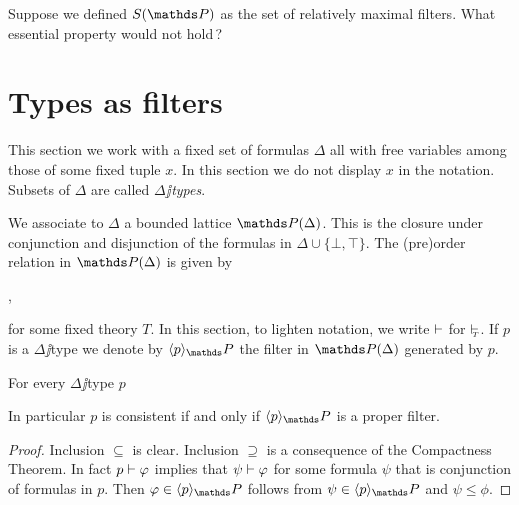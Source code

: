 \documentclass[creche.tex]{subfiles}
\begin{document}
\begin{exercise}
Suppose we defined $S(\PP)$ as the set of relatively maximal filters. What essential property would not hold\,?\QED 
\end{exercise}
\section{Types as filters}\label{frammenti}

This section we work with a fixed set of formulas \emph{$\Delta$\/} all with free variables among those of some fixed tuple \emph{$x$}. In this section we do not display $x$ in the notation. Subsets of $\Delta$ are called \emph{$\Delta\jj$types}.

We associate to $\Delta$ a bounded lattice \emph{$\PP(\Delta)$}. This is the closure under conjunction and disjunction of the formulas in $\Delta\cup\{\bot,\top\}$. The (pre)order relation in $\PP(\Delta)$ is given by

\ceq{\hfill \psi\le\phi}{\dIFF}{\psi\ \provesT\ \phi}, 

for some fixed theory $T$. In this section, to lighten notation, we write $\vdash$ for $\provesT$. If $p$ is a $\Delta\jj$type we denote by $\<p\>_\PP$ the filter in $\PP(\Delta)$ generated by $p$.




\begin{lemma}\label{lem_poiuyhdsdfd}
For every $\Delta\jj$type $p$


In particular $p$ is consistent if and only if $\<p\>_\PP$ is a proper filter.
\end{lemma}



\begin{proof}
Inclusion $\subseteq$ is clear. Inclusion $\supseteq$ is a consequence of the Compactness Theorem. In fact $p\vdash\varphi$ implies that $\psi\vdash\varphi$ for some formula $\psi$ that is conjunction of formulas in $p$. Then $\phi\in\<p\>_\PP$ follows from $\psi\in\<p\>_\PP$ and $\psi\le\phi$.
\end{proof}
\end{document}
